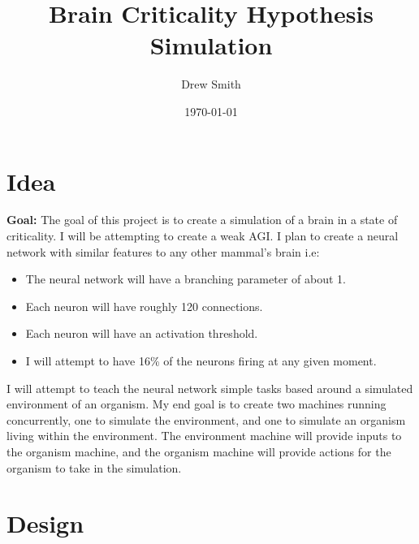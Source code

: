 \documentclass{article} %
\title{Brain Criticality Hypothesis Simulation} %
\author{Drew Smith} %
\date{\today} %
\begin{document}
    \maketitle %
    
    \section{Idea} %
    
    \textbf{Goal:} The goal of this project is to create a simulation of a brain in a state of criticality. I will be attempting to create a weak AGI. I plan to create a neural network with similar features to any other mammal's brain i.e:
    \begin{itemize}
        \item The neural network will have a branching parameter of about 1.
        \item Each neuron will have roughly 120 connections.
        \item Each neuron will have an activation threshold.
        \item I will attempt to have 16\% of the neurons firing at any given moment.
    \end{itemize}
    I will attempt to teach the neural network simple tasks based around a simulated environment of an organism. My end goal is to create two machines running concurrently, one to simulate the environment, and one to simulate an organism living within the environment. The environment machine will provide inputs to the organism machine, and the organism machine will provide actions for the organism to take in the simulation.

    \section{Design}
\end{document}
